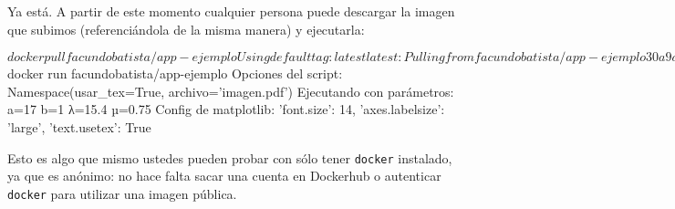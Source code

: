 Ya está. A partir de este momento cualquier persona puede descargar la imagen que subimos (referenciándola de la misma manera) y ejecutarla:

\begin{shell}
    $ docker pull facundobatista/app-ejemplo
        Using default tag: latest
        latest: Pulling from facundobatista/app-ejemplo
        30a9a79b0d7e: Pull complete
        ...
        Digest: sha256:6de9f25c02e0ae924f41d3273e01e56939366eef6d830b27e19fcc17818dde04
        Status: Downloaded newer image for facundobatista/app-ejemplo:latest
        docker.io/facundobatista/app-ejemplo:latest
    $ docker run facundobatista/app-ejemplo
    Opciones del script: Namespace(usar_tex=True, archivo='imagen.pdf')
    Ejecutando con parámetros: a=17 b=1 λ=15.4 µ=0.75
    Config de matplotlib: {'font.size': 14, 'axes.labelsize': 'large', 'text.usetex': True}
\end{shell}

Esto es algo que mismo ustedes pueden probar con sólo tener \texttt{docker} instalado, ya que es anónimo: no hace falta sacar una cuenta en Dockerhub o autenticar \texttt{docker} para utilizar una imagen pública.
